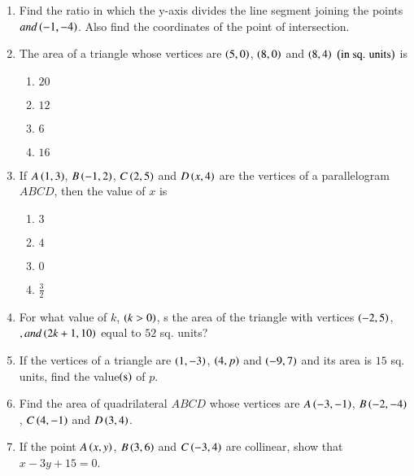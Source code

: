 \begin{enumerate}
\item Find the ratio in which the y-axis divides the line segment joining the points $ and \left(-1,-4\right)$. Also find the coordinates of the point of intersection.\\
\item The area of a triangle whose vertices are $\left(5,0\right)$, $\left(8,0\right)$ and $\left(8,4\right)$ $\left(\text{in sq. units}\right)$ is\\
\begin{enumerate}
\item $20$\\
\item $12$\\
\item $6$\\
\item $16$\\
\end{enumerate}

\item If $A\left(1,3\right)$, $B\left(-1,2\right)$, $C\left(2,5\right)$ and $D\left(x,4\right)$ are the vertices of a parallelogram $ABCD$, then the value of $x$ is\\
\begin{enumerate}
\item $3$\\
\item $4$\\
\item $0$\\
\item $\frac{3}{2}$\\
\end{enumerate}

\item For what value of $k$, $\left( k > 0\right)$, s the area of the triangle with vertices $\left(-2,5\right)$, $, and \left(2k+1,10\right)$ equal to $52$ sq. units?\\

\item If the vertices of a triangle are $\left(1,-3\right)$, $\left(4,p\right)$ and $\left(-9,7\right)$ and its area is $15$ sq. units, find the value$\left(\text{s}\right)$ of $p$.\\
\item Find the area of quadrilateral $ABCD$ whose vertices are $A\left(-3,-1\right)$, $B\left(-2,-4\right)$, $C\left(4,-1\right)$ and $D\left(3,4\right)$.\\

\item If the point $A\left(x,y\right)$, $B\left(3,6\right)$ and $C\left(-3,4\right)$ are collinear, show that $x - 3y + 15 = 0$.\\
\end{enumerate}
